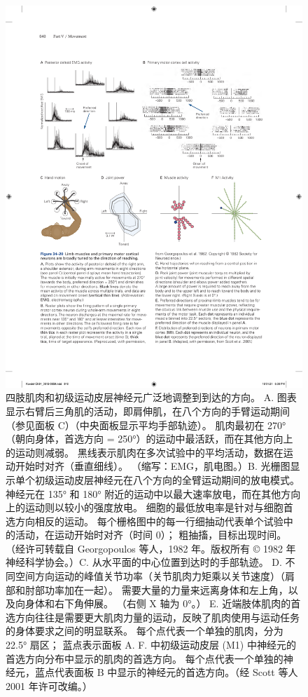 \begin{figure}[htbp]
	\centering
	\includegraphics[width=0.95\linewidth]{chap34/fig_34_20}
	\caption{四肢肌肉和初级运动皮层神经元广泛地调整到到达的方向。 A. 图表显示右臂后三角肌的活动，即肩伸肌，在八个方向的手臂运动期间（参见面板 C）（中央面板显示平均手部轨迹）。 肌肉最初在 270°（朝向身体，首选方向 = 250°）的运动中最活跃，而在其他方向上的运动则减弱。 黑线表示肌肉在多次试验中的平均活动，数据在运动开始时对齐（垂直细线）。 （缩写：EMG，肌电图。）B. 光栅图显示单个初级运动皮层神经元在八个方向的全臂运动期间的放电模式。 神经元在 135° 和 180° 附近的运动中以最大速率放电，而在其他方向上的运动则以较小的强度放电。 细胞的最低放电率是针对与细胞首选方向相反的运动。 每个栅格图中的每一行细抽动代表单个试验中的活动，在运动开始时对齐（时间 0）； 粗抽搐，目标出现时间。 （经许可转载自 Georgopoulos 等人，1982 年。版权所有 © 1982 年神经科学协会。）C. 从水平面的中心位置到达时的手部轨迹。 D. 不同空间方向运动的峰值关节功率（关节肌肉力矩乘以关节速度）（肩部和肘部功率加在一起）。 需要大量的力量来远离身体和左上角，以及向身体和右下角伸展。 （右侧 X 轴为 0°。） E. 近端肢体肌肉的首选方向往往是需要更大肌肉力量的运动，反映了肌肉使用与运动任务的身体要求之间的明显联系。 每个点代表一个单独的肌肉，分为 22.5° 扇区； 蓝点表示面板 A. F. 中初级运动皮层 (M1) 中神经元的首选方向分布中显示的肌肉的首选方向。 每个点代表一个单独的神经元，蓝点代表面板 B 中显示的神经元的首选方向。（经 Scott 等人 2001 年许可改编。）}
	\label{fig:34_20}
\end{figure}

